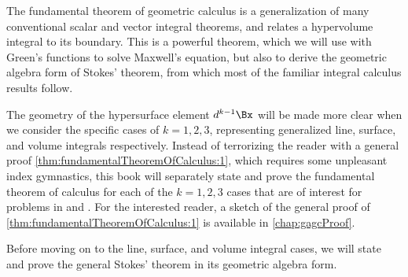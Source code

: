 %
%

The fundamental theorem of geometric calculus is a generalization of many conventional scalar and vector integral theorems, and relates a hypervolume integral to its boundary.
This is a powerful theorem, which we will use with Green's functions to solve Maxwell's equation, but also to derive the geometric algebra form of Stokes' theorem, from which most of the familiar integral calculus results follow.

The geometry of the hypersurface element \( d^{k-1} \Bx \) will be made more clear when we
consider the specific cases of \( k = 1, 2, 3 \), representing generalized line, surface, and volume integrals respectively.
Instead of terrorizing the reader with a general proof
\cref{thm:fundamentalTheoremOfCalculus:1},
which requires some unpleasant index gymnastics,
this book
will separately state and prove the fundamental theorem of calculus
for each of the \( k = 1, 2, 3 \) cases that are of interest for problems in  and .
For the interested reader, a sketch of the general proof
of \cref{thm:fundamentalTheoremOfCalculus:1}
is available in \cref{chap:gagcProof}.

Before moving on to the line, surface, and volume integral cases, we will state and prove the
general Stokes' theorem in its geometric algebra form.

